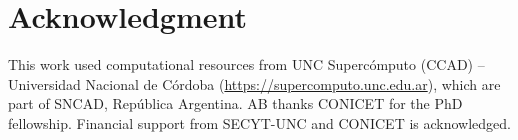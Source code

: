 \documentclass[conference,a4paper]{IEEEtran}   %
\begin{document}
\section*{Acknowledgment}

This work used computational resources from UNC Supercómputo (CCAD) -- Universidad Nacional de C\'ordoba (\url{https://supercomputo.unc.edu.ar}), which are part of SNCAD, Rep\'ublica Argentina. AB thanks CONICET for the PhD fellowship. Financial support from SECYT-UNC and CONICET is acknowledged.



\end{document}

